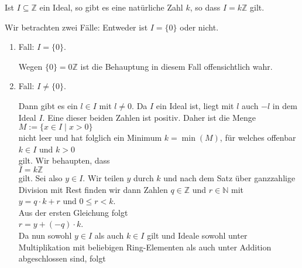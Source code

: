 \begin{Satz} \lb
Ist $I \subseteq \mathbb{Z}$ ein Ideal, so gibt es eine natürliche Zahl $k$, so dass $I = k\mathbb{Z}$
gilt.
\end{Satz}

\proof
Wir betrachten zwei Fälle:  Entweder ist $I = \{0\}$ oder nicht.
\begin{enumerate}
\item Fall: $I = \{ 0 \}$.

      Wegen $\{ 0 \} = 0\mathbb{Z}$ ist die Behauptung in diesem Fall offensichtlich
      wahr.
\item Fall: $I \not= \{ 0 \}$.

      Dann gibt es ein $l \in I$ mit $l \not= 0$.  Da $I$ ein Ideal ist, liegt mit $l$ auch $-l$ in dem
      Ideal $I$.  Eine dieser beiden Zahlen ist positiv.  Daher ist die Menge
      \\[0.2cm]
      \hspace*{1.3cm}
      $M := \{ x \in I \mid x > 0 \}$
      \\[0.2cm]
      nicht leer und hat folglich ein Minimum $k = \min(M)$, für welches offenbar
      \\[0.2cm]
      \hspace*{1.3cm}
      $k \in I$ \quad und \quad $k > 0$
      \\[0.2cm]
      gilt.  Wir behaupten, dass
      \\[0.2cm]
      \hspace*{1.3cm}
      $I = k\mathbb{Z}$
      \\[0.2cm]
      gilt.  Sei also $y \in I$.  Wir teilen $y$ durch $k$ und  nach dem Satz
      über ganzzahlige Division mit Rest finden wir dann Zahlen $q \in \mathbb{Z}$ und $r \in \mathbb{N}$ mit
      \\[0.2cm]
      \hspace*{1.3cm}
      $y = q \cdot k + r$ \quad und \quad $0 \leq r < k$.
      \\[0.2cm]
      Aus der ersten Gleichung folgt
      \\[0.2cm]
      \hspace*{1.3cm}
      $r = y + (-q) \cdot k$.
      \\[0.2cm]
      Da nun sowohl $y \in I$ als auch $k \in I$ gilt und Ideale sowohl unter Multiplikation mit
      beliebigen Ring-Elementen als auch unter Addition abgeschlossen sind, folgt
      \\[0.2cm]
      \hspace*{1.3cm}

\end{enumerate}
